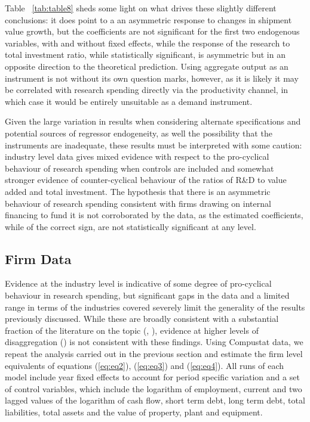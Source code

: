 \documentclass{_latex/house}
\begin{document}
Table ~\ref{tab:table8} sheds some light on what drives these slightly different conclusions: it does point to a an asymmetric response to changes in shipment value growth, but the coefficients are not significant for the first two endogenous variables, with and without fixed effects, while the response of the research to total investment ratio, while statistically significant, is asymmetric but in an opposite direction to the theoretical prediction. Using aggregate output as an instrument is not without its own question marks, however, as it is likely it may be correlated with research spending directly via the productivity channel, in which case it would be entirely unsuitable as a demand instrument.

Given the large variation in results when considering alternate specifications and potential sources of regressor endogeneity, as well the possibility that the instruments are inadequate, these results must be interpreted with some caution: industry level data gives mixed evidence with respect to the pro-cyclical behaviour of research spending when controls are included and somewhat stronger evidence of counter-cyclical behaviour of the ratios of R\&D to value added and total investment. The hypothesis that there is an asymmetric behaviour of research spending consistent with firms drawing on internal financing to fund it is not corroborated by the data, as the estimated coefficients, while of the correct sign, are not statistically significant at any level.
\subsection{Firm Data} \label{compustatallindustries}
Evidence at the industry level is indicative of some degree of pro-cyclical behaviour in research spending, but significant gaps in the data and a limited range in terms of the industries covered severely limit the generality of the results previously discussed. While these are broadly consistent with a substantial fraction of the literature on the topic (\cite{RePEc:tpr:restat:v:93:y:2011:i:2:p:542-553}, \cite{RePEc:aea:aecrev:v:97:y:2007:i:4:p:1131-1164}), evidence at higher levels of disaggregation (\cite{JEEA:JEEA1093}) is not consistent with these findings. Using Compustat data, we repeat the analysis carried out in the previous section and estimate the firm level equivalents of equations (\ref{eq:eq2}), (\ref{eq:eq3}) and (\ref{eq:eq4}). All runs of each model include year fixed effects to account for period specific variation and a set of control variables, which include the logarithm of employment, current and two lagged values of the logarithm of cash flow, short term debt, long term debt, total liabilities, total assets and the value of property, plant and equipment.
\end{document}

